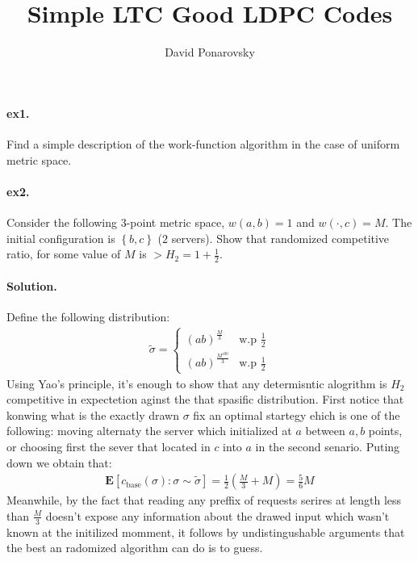 \documentclass{article}
\newcommand{\expp}[1]{ \mathbf{E} \left[ {#1} \right]}
\begin{document}
\newcommand{\dalg}[1]{\expp{#1 : \text{alg} \sim \tilde{\text{alg}}}}
\newcommand{\dsig}[1]{\expp{#1 : \sigma \sim \tilde{\sigma}}}
\newcommand{\calg}{c_{\text{alg}}}
\newcommand{\cbase}{c_{\text{base}}}


\title{Simple LTC Good LDPC Codes} 
\author{David Ponarovsky}
\maketitle
{} 
\begin{multicols*}{2}
  \paragraph{ex1.} Find a simple description of the work-function algorithm in the case of uniform metric space. 
  \paragraph{ex2.} Consider the following $3$-point metric space, $w\left( a,b \right) = 1 $ and $w\left( \cdot, c  \right) = M $. The initial configuration is $ \left\{ b,c \right\}$ ($2$ servers). Show that randomized competitive ratio, for some value of $M$ is $ > H_{2} = 1 + \frac{1}{2}$. 
  \paragraph{Solution.} Define the following distribution: 
  \begin{equation*}
    \begin{split}
      \tilde{\sigma} = \begin{cases}
	(ab)^{\frac{M}{3}} & \text{w.p  } \frac{1}{2} \\ 
	(ab)^{\frac{M^{100}}{3}} &  \text{w.p  } \frac{1}{2}  
      \end{cases}
    \end{split}
  \end{equation*}
  Using Yao's principle, it's enough to show that any determisntic alogrithm is $H_{2}$ competitive in expectetion aginst the that spasific distribution. First notice that konwing what is the exactly drawn $\sigma$ fix an optimal startegy ehich is one of the following: moving alternaty the server which initialized at $a$ between $a,b$ points, or choosing first the sever that located in $c$ into $a$ in the second senario.
  Puting down we obtain that: 
  \begin{equation*}
    \begin{split}
      \dsig{ \cbase \left( \sigma \right)  } = \frac{1}{2} \left(  \frac{M}{3} + M  \right) = \frac{5}{6}M 
    \end{split}
  \end{equation*}
  Meanwhile, by the fact that reading any preffix of requests serires at length less than $\frac{M}{3}$ doesn't expose any information about the drawed input which wasn't known at the initilized momment, it follows by undistingushable arguments that the best an radomized algorithm can do is to guess.     

\end{multicols*}
\end{document}

